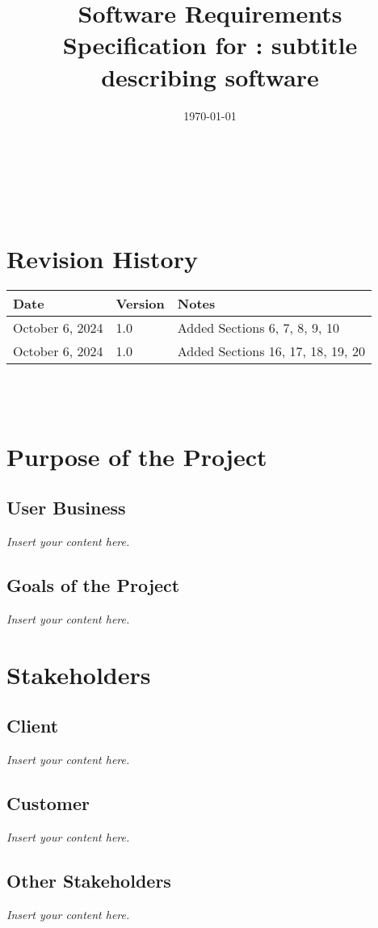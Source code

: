 \documentclass[12pt]{article}
\newcommand{\lips}{\textit{Insert your content here.}}
\begin{document}
\title{Software Requirements Specification for \progname: subtitle describing software} 
\author{\authname}
\date{\today}
	
\maketitle

~\newpage


\tableofcontents

~\newpage

\section*{Revision History}

\begin{tabularx}{\textwidth}{p{3cm}p{2cm}X}
\toprule {\textbf{Date}} & {\textbf{Version}} & {\textbf{Notes}}\\
\midrule
October 6, 2024 & 1.0 & Added Sections 6, 7, 8, 9, 10\\
October 6, 2024 & 1.0 & Added Sections 16, 17, 18, 19, 20\\
\bottomrule
\end{tabularx}

~\\

~\newpage
\section{Purpose of the Project}
\subsection{User Business}
\lips
\subsection{Goals of the Project}
\lips
\section{Stakeholders}
\subsection{Client}
\lips
\subsection{Customer}
\lips
\subsection{Other Stakeholders}
\lips
\end{document}
